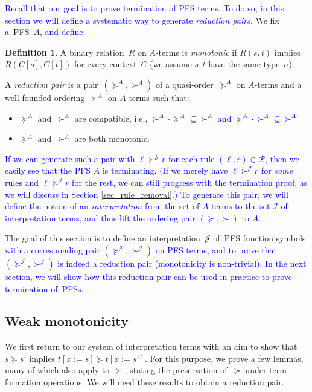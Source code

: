 \documentclass[a4paper,UKenglish,cleveref,autoref,numberwithinsect]{lipics-v2019}
\theoremstyle{definition}
\newtheorem{defn}[theorem]{Definition}
\newcommand{\Rules}{\mathcal{R}}
\newcommand{\Iterms}{\mathcal{I}}
\newcommand{\subst}[2]{#1:=#2}
\newcommand{\Termmap}{\mathcal{J}}
\newcommand{\succinterpret}{\succ^{\Termmap}}
\newcommand{\succeqinterpret}{\succeq^{\Termmap}}
\newcommand{\CKchange}[1]{\textcolor{blue}{#1}}
\begin{document}
\CKchange{Recall that our goal is to prove termination of PFS terms.  To
do so, in this section we will define a systematic way to generate
\emph{reduction pairs}.}  We fix a~PFS~$A$\CKchange{, and define:}

\begin{defn}
  A binary relation~$R$ on $A$-terms is \emph{monotonic} if $R(s, t)$
  implies $R(C[s], C[t])$ for every context~$C$ (we assume $s,t$ have
  the same type~$\sigma$).

  A \emph{reduction pair} is a pair~$(\succeq^A,\succ^A)$ of a
  quasi-order~$\succeq^A$ on $A$-terms and a well-founded
  ordering~$\succ^A$ on $A$-terms such that:
  \begin{itemize}
  \item $\succeq^A$ and~$\succ^A$ are compatible, i.e., ${\succ^A}
    \cdot {\succeq^A} \subseteq {\succ^A}$
    \CKchange{and ${\succeq^A} \cdot {\succ^A} \subseteq {\succ^A}$}
  \item $\succeq^A$ and~$\succ^A$ are both monotonic.
  \end{itemize}
\end{defn}


\CKchange{If we can generate such a pair with $\ell \succinterpret r$ for each
rule $(\ell,r) \in \Rules$, then we easily see that the PFS $A$ is
terminating.  (If we merely have $\ell \succinterpret r$ for \emph{some}
rules and $\ell \succeqinterpret r$ for the rest, we can still progress
with the termination proof, as we will discuss in Section
\ref{sec_rule_removal}.)
To generate this pair, we will define the notion of an
\emph{interpretation} from the set of $A$-terms to the set $\Iterms$ of
interpretation terms, and thus lift the ordering pair $(\succeq,\succ)$
to $A$.
}

The goal of this section is to define an interpretation~$\Termmap$
of~PFS function symbols \CKchange{with a corresponding pair
$(\succeqinterpret,\succinterpret)$ on PFS terms, and to prove
that $(\succeqinterpret,\succinterpret)$ is indeed a reduction pair
(monotonicity is non-trivial).  In the next section, we will show how
this reduction pair can be used in practice to prove termination
of~PFSs.}

\subsection{Weak monotonicity}\label{subsec:weakmono}

We first return to our system of interpretation terms with an aim to
show that $s \succeq s'$ implies $t[\subst{x}{s}] \succeq
t[\subst{x}{s'}]$. For this purpose, we prove a few lemmas, many of
which also apply to~$\succ$, stating the preservation of~$\succeq$
under term formation operations. We will need these results to obtain
a reduction pair.
\end{document}
